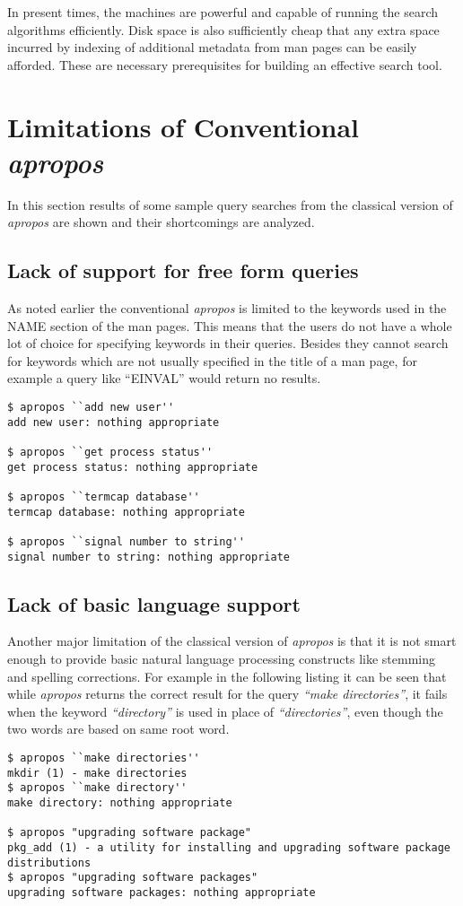 \documentclass[titlepage, a4paper, 12pt]{article}
\begin{document}
In present times, the machines are powerful and  capable of running the search
algorithms efficiently. Disk
space is also sufficiently cheap that any extra space incurred by indexing of
additional metadata from man pages
can be easily afforded. These are necessary prerequisites for building an
effective search tool.

\section{Limitations of Conventional \textit{apropos}}
In this section results of some sample query searches from
the classical version of \textit{apropos} are shown and their shortcomings are
analyzed.

\subsection{Lack of support for free form queries}
As noted earlier the conventional \textit{apropos} is limited to the keywords
used in the NAME section of the man pages. This means that the users do not have
a whole lot of choice for specifying keywords in their queries. Besides they
cannot search for keywords which are not usually specified in the title of a man
page, for example a query like ``EINVAL'' would return no results.
\begin{lstlisting}
$ apropos ``add new user''
add new user: nothing appropriate

$ apropos ``get process status''
get process status: nothing appropriate

$ apropos ``termcap database''
termcap database: nothing appropriate

$ apropos ``signal number to string''
signal number to string: nothing appropriate
\end{lstlisting}

\subsection{Lack of basic language support}
Another major limitation of the classical version of \textit{apropos} is that
it is not smart enough to provide basic natural language processing constructs
like stemming and spelling corrections.
For example in the following listing it can be seen
that while \textit{apropos} returns the correct result for the query
\textit{``make directories''}, it fails when the keyword \textit{``directory''}
is used in place of \textit{``directories''}, even though the two words are based
on same root word.
\begin{lstlisting}
$ apropos ``make directories''
mkdir (1) - make directories
$ apropos ``make directory''
make directory: nothing appropriate

$ apropos "upgrading software package"
pkg_add (1) - a utility for installing and upgrading software package
distributions
$ apropos "upgrading software packages"
upgrading software packages: nothing appropriate
\end{lstlisting}
\end{document}
